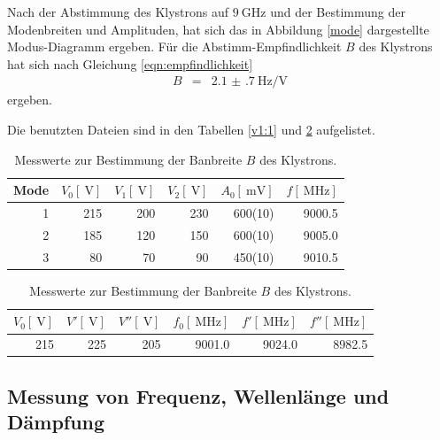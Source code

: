 Nach der Abstimmung des Klystrons auf $\SI{9}{\giga\hertz}$ und der Bestimmung der Modenbreiten und Amplituden, hat sich das in Abbildung \ref{mode} dargestellte Modus-Diagramm ergeben.
Für die Abstimm-Empfindlichkeit $B$ des Klystrons hat sich nach Gleichung \eqref{eqn:empfindlichkeit}
\begin{eqnarray}
	B &=& \SI{2.1(7)}{\hertz\per\volt}
\end{eqnarray}
ergeben.

Die benutzten Dateien sind in den Tabellen \ref{v1:1} und \ref{v1:2} aufgelistet.

\begin{table}
\centering
\caption{Messwerte zur Darstellung des Modus-Diagramms.}
\begin{tabular}{r r r r r r}
	Mode & $V_\text{0}[\SI{}{\volt}]$ & $V_\text{1}[\SI{}{\volt}]$ & $V_\text{2}[\SI{}{\volt}]$ & $A_\text{0}[\SI{}{\milli\volt}]$ & $f[\SI{}{\mega\hertz}]$ \\
	\hline
	\hline
	1 & 215 & 200 & 230 & {600(10)} & 9000.5\\
	2 & 185 & 120 & 150 & {600(10)} & 9005.0\\
	3 &  80 &  70 &  90 & {450(10)} & 9010.5\\
	\hline
\end{tabular}
\label{v1:1}
\caption{Messwerte zur Bestimmung der Banbreite $B$ des Klystrons.}
\begin{tabular}{r r r r r r}
	$V_\text{0}[\SI{}{\volt}]$ & $V'[\SI{}{\volt}]$ & $V''[\SI{}{\volt}]$ & $f_\text{0}[\SI{}{\mega\hertz}]$  & $f'[\SI{}{\mega\hertz}]$ & $f''[\SI{}{\mega\hertz}]$ \\
	\hline
	\hline
	215 & 225 & 205 & 9001.0 & 9024.0 & 8982.5\\
	\hline
\end{tabular}
\label{v1:2}
\end{table}

\FloatBarrier

\subsection{Messung von Frequenz, Wellenlänge und Dämpfung} %
\label{sub:messung_von_frequenz_wellenlaenge_und_daempfung}

